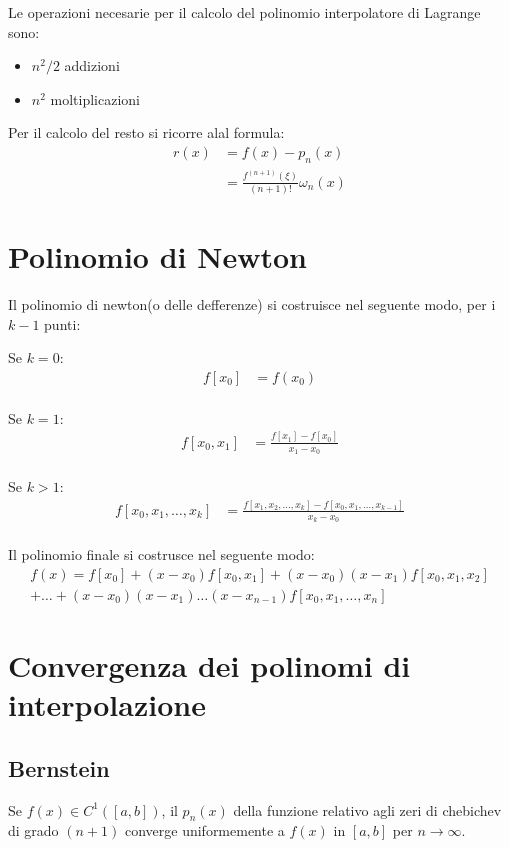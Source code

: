 Le operazioni necesarie per il calcolo del polinomio interpolatore di Lagrange sono:

\begin{itemize}
  \item $n^2/2$ addizioni
  \item $n^2$ moltiplicazioni
\end{itemize}

Per il calcolo del resto si ricorre alal formula:
\begin{align}
  r(x) &= f(x) - p_n(x) \\
        &= \frac{f^{(n+1)}(\xi)}{(n+1)!} \omega_n(x)
\end{align}


\section{Polinomio di Newton}

Il polinomio di newton(o delle defferenze) si costruisce nel seguente modo, per i $k-1$ punti:

Se $k=0$:
\begin{align}
  f[x_0] &= f(x_0) \\
\end{align}

Se $k=1$:
\begin{align}
  f[x_0,x_1] &= \frac{f[x_1]-f[x_0]}{x_1-x_0} \\
\end{align}

Se $k>1$:
\begin{align}
  f[x_0,x_1,\dots,x_k] &= \frac{f[x_1,x_2,\dots,x_k]-f[x_0,x_1,\dots,x_{k-1}]}{x_k-x_0} \\
\end{align}


Il polinomio finale si costrusce nel seguente modo:
\begin{align}
  f(x) = f[x_0] + (x-x_0)f[x_0,x_1] + (x-x_0)(x-x_1)f[x_0,x_1,x_2] \\ + \dots + (x-x_0)(x-x_1)\dots(x-x_{n-1})f[x_0,x_1,\dots,x_n]
\end{align}



\section{Convergenza dei polinomi di interpolazione}

\subsection{Bernstein}
Se $f(x) \in C^1([a, b])$, il $p_n(x)$ della funzione relativo agli zeri di chebichev di grado $(n+1)$
converge uniformemente a $f(x)$ in $[a, b]$ per $n \rightarrow \infty$.


